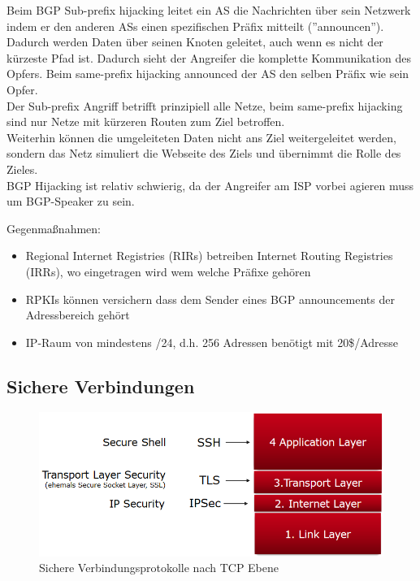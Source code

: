 \documentclass[a4paper,12pt,leqno]{article}
\begin{document}
Beim BGP Sub-prefix hijacking leitet ein AS die Nachrichten über sein Netzwerk indem er den anderen ASs einen spezifischen Präfix mitteilt (''announcen''). Dadurch werden Daten über seinen Knoten geleitet, auch wenn es nicht der kürzeste Pfad ist. Dadurch sieht der Angreifer die komplette Kommunikation des Opfers. Beim same-prefix hijacking announced der AS den selben Präfix wie sein Opfer.\\
Der Sub-prefix Angriff betrifft prinzipiell alle Netze, beim same-prefix hijacking sind nur Netze mit kürzeren Routen zum Ziel betroffen.\\
Weiterhin können die umgeleiteten Daten nicht ans Ziel weitergeleitet werden, sondern das Netz simuliert die Webseite des Ziels und übernimmt die Rolle des Zieles.\\
BGP Hijacking ist relativ schwierig, da der Angreifer am ISP vorbei agieren muss um BGP-Speaker zu sein.\\
\label{txt:BGP-PrefixHijacking}

Gegenmaßnahmen:
\begin{itemize}
\item Regional Internet Registries (RIRs) betreiben Internet Routing Registries (IRRs), wo eingetragen wird wem welche Präfixe gehören
\item RPKIs können versichern dass dem Sender eines BGP announcements der Adressbereich gehört
\item IP-Raum von mindestens /24, d.h. 256 Adressen benötigt mit 20\$/Adresse 
\end{itemize}

\subsection{Sichere Verbindungen}

\begin{figure}[h!]
\centering
\includegraphics[scale=0.42]{Grafiken/Protokolle-nach-Ebene.png}
\caption{Sichere Verbindungsprotokolle nach TCP Ebene}
\end{figure}
\end{document}
